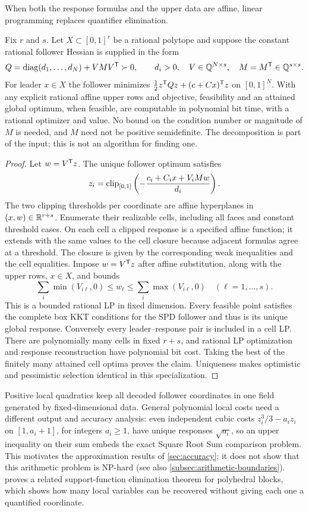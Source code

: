When both the response formulas and the upper data are affine, linear
programming replaces quantifier elimination.
\begin{corollary}\label{cor:low-rank-lp}
Fix $r$ and $s$. Let $X\subset[0,1]^r$ be a rational polytope and
suppose the constant rational follower Hessian is supplied in the form
\[
        Q=\operatorname{diag}(d_1,\ldots,d_N)+VMV^{\mathsf T}\succ0,
 \qquad d_i>0,\quad V\in\mathbb Q^{N\times s},\quad M=M^{\mathsf T}\in\mathbb Q^{s\times s}.
\]
For leader $x\in X$ the follower minimizes
$\tfrac12z^{\mathsf T} Qz+(c+Cx)^{\mathsf T} z$ on $[0,1]^N$.
With any explicit rational affine upper rows and objective, feasibility
and an attained global optimum, when feasible, are computable in
polynomial bit time, with a rational optimizer and value.
No bound on the condition number or magnitude of $M$ is needed, and
$M$ need not be positive semidefinite. The decomposition is part of the
input; this is not an algorithm for finding one.
\end{corollary}
\begin{proof}
Let $w=V^{\mathsf T} z$. The unique follower optimum satisfies
\[
 z_i=\operatorname{clip}_{[0,1]}\left(-\frac{c_i+C_ix+V_iMw}{d_i}\right).
\]
The two clipping thresholds per coordinate are affine hyperplanes in
$(x,w)\in\mathbb R^{r+s}$. Enumerate their realizable cells, including all
faces and constant threshold cases. On each cell a clipped response is
a specified affine function; it extends with the same values to the
cell closure because adjacent formulas agree at a threshold. The
closure is given by the corresponding weak inequalities and the
cell equalities. Impose $w=V^{\mathsf T} z$ after affine substitution,
along with the upper rows, $x\in X$, and bounds
\[
       \sum_i\min(V_{i\ell},0)\le w_\ell\le
       \sum_i\max(V_{i\ell},0)\quad(\ell=1,\ldots,s).
\]
This is a bounded rational LP in fixed dimension. Every feasible point
satisfies the complete box KKT conditions for the SPD follower and thus
is its unique global response. Conversely every leader--response pair
is included in a cell LP. There are polynomially many cells in fixed
$r+s$, and rational LP optimization and response reconstruction have
polynomial bit cost. Taking the best of the finitely many attained cell
optima proves the claim. Uniqueness makes optimistic and pessimistic
selection identical in this specialization.
\end{proof}

Positive local quadratics keep all decoded follower coordinates in one
field generated by fixed-dimensional data. General polynomial local costs
need a different output and accuracy analysis: even independent cubic
costs $z_i^3/3-a_i z_i$ on $[1,a_i+1]$, for integers $a_i\ge1$, have
unique responses $\sqrt{a_i}$, so an upper inequality on their sum embeds
the exact Square Root Sum comparison problem. This motivates the approximation results
of \cref{sec:accuracy}; it does not show that this arithmetic problem is
NP-hard (see also \cref{subsec:arithmetic-boundaries}).
 proves a related support-function elimination
theorem for polyhedral blocks, which shows how many local variables can be
recovered without giving each one a quantified coordinate.
